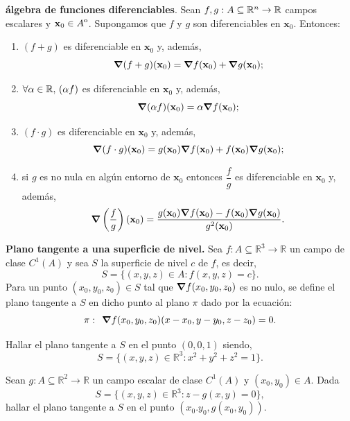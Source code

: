 \begin{propertie}\label{prop:alg_dif} \textbf{\'algebra de funciones diferenciables}.  Sean $f,g:A  \subseteq  \mathbb{R}^n \to \mathbb{R}$ campos escalares y $\mathbf{x}_0 \in  {\kern0ptA}^{\mathrm{o}}$. Supongamos que
$f$ y $g$ son diferenciables en $\mathbf{x}_0$.
  Entonces:
  \begin{enumerate} 
   \item[1.] $(f + g)$ es diferenciable en $\mathbf{x}_0$ y, adem\'as,
   \[
    \grad(f + g)(\mathbf{x}_0) = \grad f(\mathbf{x}_0) + \grad g(\mathbf{x}_0);
   \]

   \item[2.] $\forall \alpha \in \mathbb{R}, \, (\alpha f)$  es diferenciable en $\mathbf{x}_0$ y, adem\'as,
   \[
    \grad(\alpha f)(\mathbf{x}_0) = \alpha \grad f(\mathbf{x}_0);
   \]

   \item[3.] $(f \cdot g)$ es diferenciable en $\mathbf{x}_0$ y, adem\'as,
   \[
    \grad(f \cdot g)(\mathbf{x}_0) = g(\mathbf{x}_0) \grad f(\mathbf{x}_0) + f(\mathbf{x}_0) \grad g(\mathbf{x}_0);
   \]

   \item[4.] si $g$ es no nula en alg\'un entorno de $\mathbf{x}_0$ entonces  $\dfrac{f}{g}$ es diferenciable en $\mathbf{x}_0$ y, adem\'as,
   \[
    \grad \left( \dfrac{f}{g} \right)  (\mathbf{x}_0) = \frac{g(\mathbf{x}_0) \grad f(\mathbf{x}_0) - f(\mathbf{x}_0) \grad g(\mathbf{x}_0)}{g^2(\mathbf{x}_0)}.
   \]
\end{enumerate}
\end{propertie}

\begin{definition}\textbf{Plano tangente a una superficie de nivel.}  Sea $f: A  \subseteq  \mathbb{R}^{3} \to \mathbb{R}$ un campo de clase $C^{1}(A)$ y sea $S$ la superficie de  nivel $c$ de $f$, es decir, $$S=\{(x,y,z) \in A: f(x,y,z)=c \}.$$ 
Para un  punto $(x_0,y_0,z_0) \in S$ tal que $\grad f(x_0,y_0,z_0)$ es no nulo,  se define el plano tangente a $S$ en dicho punto al plano $\pi$ dado por la ecuaci\'on: $$\pi: \:\: \grad f(x_0,y_0,z_0) (x-x_0,y-y_0,z-z_0)=0. $$ 
\end{definition}

\begin{tarea} Hallar el plano tangente a $S$ en el punto $(0,0,1)$ siendo,    $$S=\{(x,y,z)\in \mathbb{R}^{3} :  x^{2}+y^{2}+z^{2}=1 \}.$$ 
\end{tarea}
\begin{tarea} Sean $g: A  \subseteq  \mathbb{R}^{2} \to \mathbb{R}$ un campo escalar de clase $C^{1}(A)$  y $(x_0,y_0) \in A$. Dada   $$S=\{(x,y,z)\in \mathbb{R}^{3} :  z-g(x,y)=0 \},$$  hallar el plano tangente a $S$ en el punto $(x_0.y_0, g(x_0,y_0))$.
\end{tarea}


